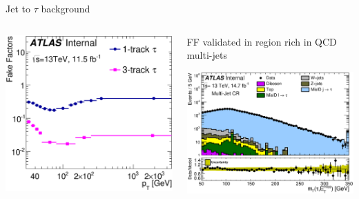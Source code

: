 \documentclass[10pt]{beamer}
\begin{document}
\begin{frame}{Jet to $\tau$ background}
\begin{columns}
	\begin{column}{0.5\linewidth}
   \includegraphics[width=\textwidth]{figures/GetTauFFmed2D_2016.eps} 
	\end{column}
	\begin{column}{0.5\linewidth}
	\begin{outline}
\1 FF validated in region rich in QCD multi-jets
	\end{outline}
   \includegraphics[width=\textwidth]{figures/DDQCD15_QCD_MT.eps}
	\end{column}
\end{columns}

\end{frame}
\end{document}
